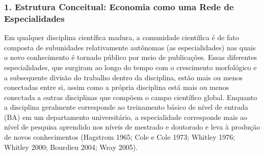 \documentclass[12pt]{article}
\begin{document}
\subsubsection{\textbf{1. Estrutura Conceitual: Economia como uma Rede de Especialidades}}

Em qualquer disciplina científica madura, a comunidade científica é de fato composta de subunidades relativamente autônomas (as especialidades) nas quais o novo conhecimento é tornado público por meio de publicações. Essas diferentes especialidades, que surgiram ao longo do tempo com o crescimento morfológico e a subsequente divisão do trabalho dentro da disciplina, estão mais ou menos conectadas entre si, assim como a própria disciplina está mais ou menos conectada a outras disciplinas que compõem o campo científico global. Enquanto a disciplina geralmente corresponde ao treinamento básico de nível de entrada (BA) em um departamento universitário, a especialidade corresponde mais ao nível de pesquisa aprendido nos níveis de mestrado e doutorado e leva à produção de novos conhecimentos (Hagstrom 1965; Cole e Cole 1973; Whitley 1976; Whitley 2000; Bourdieu 2004; Wray 2005).
\end{document}
